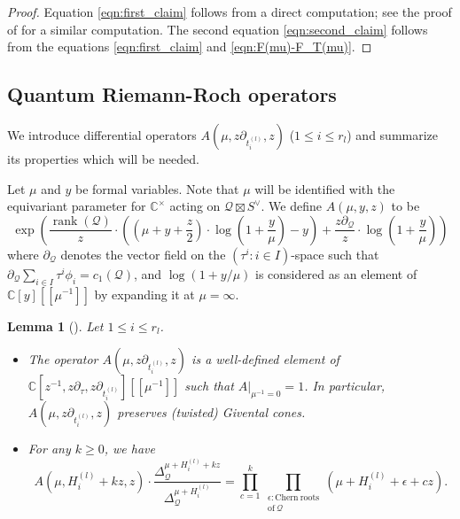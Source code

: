 \documentclass[a4paper,12pt]{amsart}
\numberwithin{equation}{section}
\newtheorem{lemma}[theorem]{Lemma}
\theoremstyle{definition}
\newcommand{\C}{\mathbb{C}}
\newcommand{\rank}{\operatorname{rank}}
\begin{document}
\begin{proof}
    Equation \eqref{eqn:first_claim} follows from a direct computation; see the proof of \cite[Lemma 5.5]{Koto:mirror} for a similar computation.
    The second equation \eqref{eqn:second_claim} follows from the equations \eqref{eqn:first_claim} and \eqref{eqn:F(mu)-F_T(mu)}.
\end{proof}


\subsection{Quantum Riemann-Roch operators}
We introduce differential operators $A(\mu,z\partial_{t^{(l)}_i},z)$ ($1\leq i\leq r_l$) and summarize its properties which will be needed.
    
Let $\mu$ and $y$ be formal variables.
Note that $\mu$ will be identified with the equivariant parameter for $\C^\times$ acting on $\mathcal{Q}\boxtimes S^\vee$.
We define $A(\mu,y,z)$ to be
\[
\exp\left( \frac{\rank(\mathcal{Q})}{z} \cdot \left( \left( \mu+y+\frac{z}{2} \right) \cdot \log\left(1+\frac{y}{\mu}\right) - y \right) + \frac{z\partial_\mathcal{Q}}{z} \cdot \log \left( 1+\frac{y}{\mu} \right) \right)
\]
where $\partial_{\mathcal{Q}}$ denotes the vector field on the $(\tau^i\colon i\in I)$-space such that $\partial_{\mathcal{Q}}\sum_{i\in I}\tau^i\phi_i=c_1(\mathcal{Q})$, and $\log(1+y/\mu)$ is considered as an element of $\C[y][\![\mu^{-1}]\!]$ by expanding it at $\mu=\infty$.



\begin{lemma}[{\cite[Lemma 5.6]{Koto:mirror}}]\label{lem:QRR_operators}
    Let $1\leq i\leq r_l$.
    \begin{itemize}
        \item[$(1)$]
        The operator $A(\mu,z\partial_{t^{(l)}_i},z)$ is a well-defined element of $\C[z^{-1},z\partial_\tau,z\partial_{t^{(l)}_i}][\![\mu^{-1}]\!]$ such that $A|_{\mu^{-1}=0}=1$.
        In particular, $A(\mu,z\partial_{t^{(l)}_i},z)$ preserves (twisted) Givental cones.
        \item[$(2)$]
        For any $k\geq0$, we have
        \[
        A(\mu,H^{(l)}_i+kz,z)\cdot\frac{\Delta_{\mathcal{Q}}^{\mu+H_i^{(l)}+kz}}{\Delta_{\mathcal{Q}}^{\mu+H_i^{(l)}}} = \prod_{c=1}^{k}\prod_{ \substack{\epsilon\colon\mathrm{Chern\ roots} \\ \mathrm{of\ } \mathcal{Q}} } (\mu+H_i^{(l)}+\epsilon+cz).
        \]
    \end{itemize}
\end{lemma}
\end{document}
